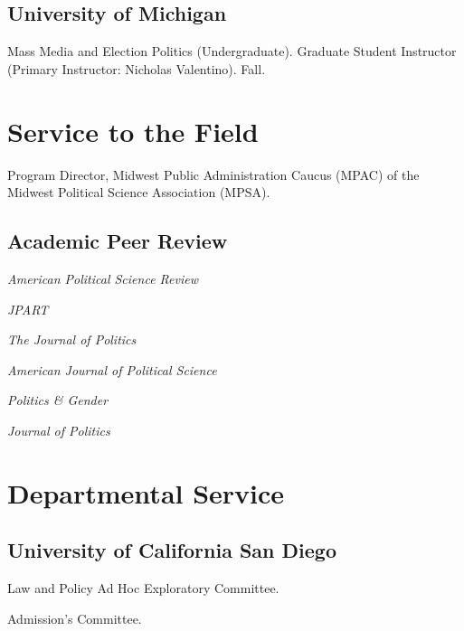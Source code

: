 \documentclass[12pt,letterpaper]{report}
\newcommand{\listitemspace}{0.25em}
\renewenvironment{itemize}
{\begin{list}{}{\setlength{\leftmargin}{0em}
                \setlength{\parskip}{0em}
                \setlength{\itemsep}{\listitemspace}
                \setlength{\parsep}{\listitemspace}}}
{\end{list}}
\newcommand{\tacourse}[5]{\item[#1] \tab{}#3 (#4). #5. #2.} %
\begin{document}
   \subsection*{University of Michigan}

   \begin{tablist}
    \tacourse{2013}{Fall}{Mass Media and Election Politics}{Undergraduate}{Graduate Student Instructor (Primary Instructor: Nicholas Valentino)}
    \end{tablist}
    
    
    \section*{Service to the Field}
	
	\begin{itemize}
		\item Program Director, Midwest Public Administration Caucus (MPAC) of the Midwest Political Science Association (MPSA).
	\end{itemize}
	
    \subsection*{Academic Peer Review}
    
    \begin{itemize}
        \item[] \emph{American Political Science Review}
        \item[] \emph{JPART}
        \item[] \emph{The Journal of Politics}
        \item[] \emph{American Journal of Political Science}
        \item[] \emph{Politics \& Gender}
		\item[] \emph{Journal of Politics}
    \end{itemize}
	    
    \section*{Departmental Service}
    
    \subsection*{University of California San Diego}
    \begin{tablist}
        \item[2021-] \tab{}Law and Policy Ad Hoc Exploratory Committee.
        \item[2020-] \tab{}Admission's Committee.
    \end{tablist}
    
\end{document}
